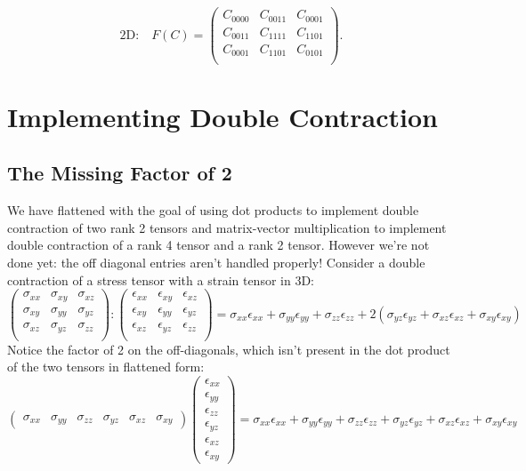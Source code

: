 \documentclass[10pt]{article}
\providecommand{\e}{\epsilon}
\begin{document}
$$
\text{2D:}\quad
F(C) = 
\left(
\begin{array}{ccc}
 C_{0000} & C_{0011} & C_{0001} \\
 C_{0011} & C_{1111} & C_{1101} \\
 C_{0001} & C_{1101} & C_{0101} \\
\end{array}
\right).
$$

\section{Implementing Double Contraction}
\subsection{The Missing Factor of 2}
We have flattened with the goal of using dot products to implement double contraction
of two rank 2 tensors and matrix-vector multiplication to implement double
contraction of a rank 4 tensor and a rank 2 tensor. However we're not done yet:
the off diagonal entries aren't handled properly! Consider a double contraction
of a stress tensor with a strain tensor in 3D:
$$
\left( \begin{array}{ccc}
 \sigma_{xx} & \sigma_{xy} & \sigma_{xz} \\
 \sigma_{xy} & \sigma_{yy} & \sigma_{yz} \\
 \sigma_{xz} & \sigma_{yz} & \sigma_{zz} \\
\end{array} \right) :
\left( \begin{array}{ccc}
 \epsilon_{xx} & \epsilon_{xy} & \epsilon_{xz} \\
 \epsilon_{xy} & \epsilon_{yy} & \epsilon_{yz} \\
 \epsilon_{xz} & \epsilon_{yz} & \epsilon_{zz} \\
\end{array} \right) = 
\sigma_{xx} \epsilon_{xx}+\sigma_{yy} \epsilon_{yy}+\sigma_{zz} \epsilon_{zz}+ 2\left(\sigma_{yz} \epsilon_{yz}+ \sigma_{xz} \epsilon_{xz} + \sigma_{xy} \epsilon_{xy} \right)
$$
Notice the factor of 2 on the off-diagonals, which isn't present in the dot product of the two tensors in flattened form:
$$
\begin{pmatrix}
    \sigma_{xx} &
    \sigma_{yy} &
    \sigma_{zz} &
    \sigma_{yz} &
    \sigma_{xz} &
    \sigma_{xy}
\end{pmatrix}
\begin{pmatrix}
    \e_{xx} \\
    \e_{yy} \\
    \e_{zz} \\
    \e_{yz} \\
    \e_{xz} \\
    \e_{xy}
\end{pmatrix} = \sigma_{xx} \epsilon_{xx}+\sigma_{yy} \epsilon_{yy}+\sigma_{zz} \epsilon_{zz}+ \sigma_{yz} \epsilon_{yz}+ \sigma_{xz} \epsilon_{xz} + \sigma_{xy} \epsilon_{xy}
$$
\end{document}
